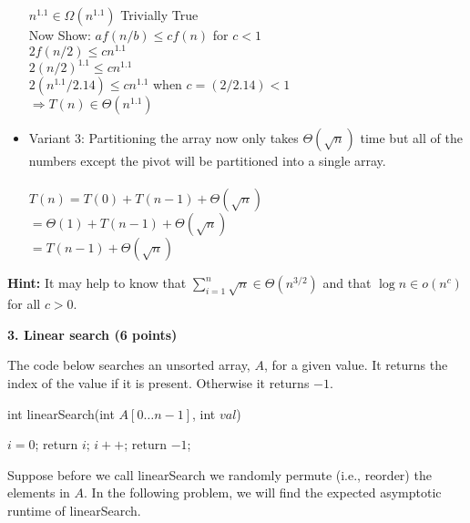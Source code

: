 \documentclass[12pt]{elsart}
\begin{document}
\begin{itemize}
	$n^{1.1} \in \Omega (n^{1.1})$ Trivially True\\
	Now Show: $af(n/b) \leq cf(n)$ for $c<1$\\
	$2f(n/2) \leq cn^{1.1}$\\
	$2(n/2)^{1.1} \leq cn^{1.1}$\\
	$2(n^{1.1}/2.14) \leq cn^{1.1}$ when $c=(2/2.14)<1$\\
	$\Rightarrow \boxed{T(n)\in \Theta (n^{1.1})}$\\
 \item  Variant 3: Partitioning the array now only takes $\Theta (\sqrt{n})$ time but all of the numbers except the pivot will be partitioned into a single array.\\\\
	$T(n)=T(0)+T(n-1)+\Theta (\sqrt{n})$\\
	$=\Theta(1) +T(n-1)+\Theta(\sqrt{n})$\\
	$=T(n-1)+\Theta(\sqrt{n})$\\
\end{itemize}

{\bf Hint:} It may help to know that $\sum\limits_{i=1}^n \sqrt{n} \in \Theta(n^{3/2})$ and that $\log n \in o(n^c)$ for all $c>0$.

\newpage

{\bf 3. Linear search (6 points)}

The code below searches an unsorted array, $A$, for a given value.  It returns the index of the value if it is present.  Otherwise it returns $-1$.

\begin{algorithm}
\caption{int linearSearch(int $A[0\ldots n-1]$, int $val$)}
 \begin{algorithmic}
 \State $i = 0$;
       \State return $i$;
    \EndIf
    \State $i++$;
  \EndWhile
 \State return $-1$;
\end{algorithmic}
\end{algorithm}

Suppose before we call linearSearch we randomly permute (i.e., reorder) the elements in $A$.  In the following problem, we will find the expected asymptotic runtime of linearSearch.
\end{document}
